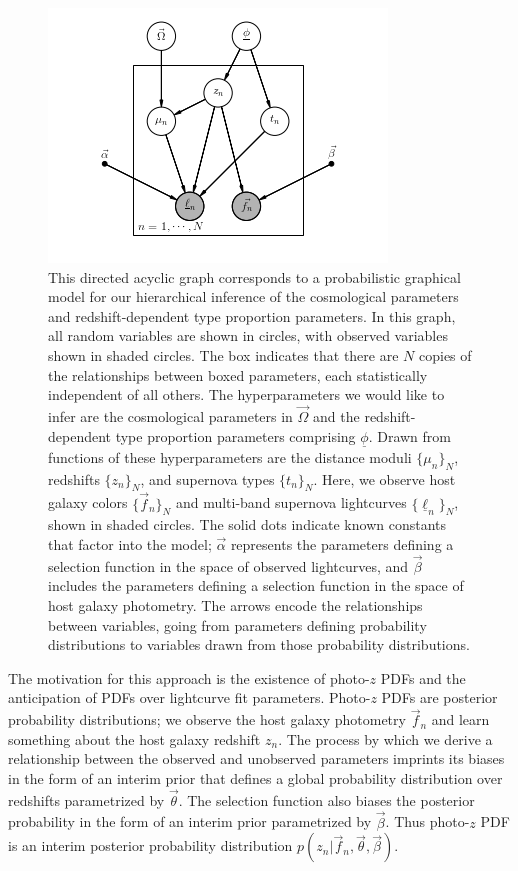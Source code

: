 \documentclass[12pt, onecolumn]{emulateapj}
\newcommand{\textul}{\underline}
\begin{document}
\vspace{1in}
\begin{figure}
\begin{center}
\includegraphics{pgm.png}
\caption{This directed acyclic graph corresponds to a probabilistic graphical model for our hierarchical inference of the cosmological parameters and redshift-dependent type proportion parameters.  In this graph, all random variables are shown in circles, with observed variables shown in shaded circles.  The box indicates that there are $N$ copies of the relationships between boxed parameters, each statistically independent of all others.  The hyperparameters we would like to infer are the cosmological parameters in $\vec{\Omega}$ and the redshift-dependent type proportion parameters comprising $\textul{\phi}$.  Drawn from functions of these hyperparameters are the distance moduli $\{\mu_{n}\}_{N}$, redshifts $\{z_{n}\}_{N}$, and supernova types $\{t_{n}\}_{N}$.  Here, we observe host galaxy colors $\{\vec{f}_{n}\}_{N}$ and multi-band supernova lightcurves $\{\textul{\ell}_{n}\}_{N}$, shown in shaded circles.  The solid dots indicate known constants that factor into the model; $\vec{\alpha}$ represents the parameters defining a selection function in the space of observed lightcurves, and $\vec{\beta}$ includes the parameters defining a selection function in the space of host galaxy photometry.  The arrows encode the relationships between variables, going from parameters defining probability distributions to variables drawn from those probability distributions.}
\label{fig:pgm}
\end{center}
\end{figure}
\vspace{1in}

The motivation for this approach is the existence of photo-$z$ PDFs and the anticipation of PDFs over lightcurve fit parameters.  Photo-$z$ PDFs are posterior probability distributions; we observe the host galaxy photometry $\vec{f}_{n}$ and learn something about the host galaxy redshift $z_{n}$.  The process by which we derive a relationship between the observed and unobserved parameters imprints its biases in the form of an interim prior that defines a global probability distribution over redshifts parametrized by $\vec{\theta}$.  The selection function also biases the posterior probability in the form of an interim prior parametrized by $\vec{\beta}$.  Thus photo-$z$ PDF is an interim posterior probability distribution $p(z_{n} | \vec{f}_{n}, \vec{\theta}, \vec{\beta})$.
\end{document}
